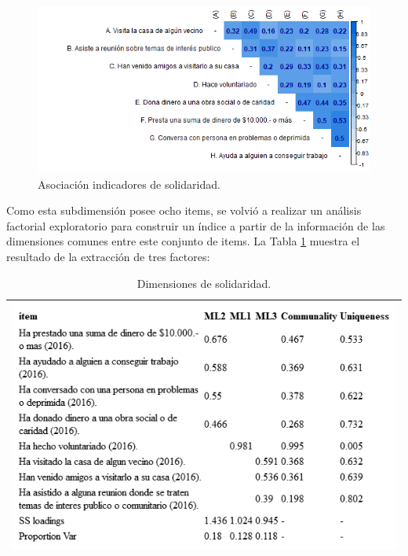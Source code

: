 \documentclass[
  12pt,
]{book}
\begin{document}
\begin{figure}[H]

{\centering \includegraphics[width=1\linewidth,height=1\textheight]{output/graphs/solidaridad_cor} 

}

\caption{Asociación indicadores de solidaridad.}\label{fig:solidaridad-cor}
\end{figure}

Como esta subdimensión posee ocho items, se volvió a realizar un análisis factorial exploratorio para construir un índice a partir de la información de las dimensiones comunes entre este conjunto de items. La Tabla \ref{tab:solidaridad-fa} muestra el resultado de la extracción de tres factores:

\begin{longtable}[]{@{}l@{}}
\caption{\label{tab:solidaridad-fa}Dimensiones de solidaridad.}\tabularnewline
\toprule
\endhead
\includegraphics[width=8.33333in,height=\textheight]{output/tables/solidaridad_fa.png}\tabularnewline
\bottomrule
\end{longtable}
\end{document}

